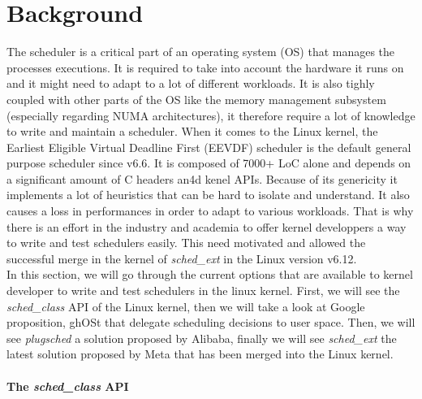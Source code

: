 \section{Background}

\par The scheduler is a critical part of an operating system (OS) that manages the processes executions. It is required to take into account the hardware it runs on and it might need to adapt to a lot of different workloads. It is also tighly coupled with other parts of the OS like the memory management subsystem (especially regarding NUMA architectures), it therefore require a lot of knowledge to write and maintain a scheduler. When it comes to the Linux kernel, the Earliest Eligible Virtual Deadline First (EEVDF) scheduler is the default general purpose scheduler since v6.6. It is composed of 7000+ LoC alone and depends on a significant amount of C headers an4d kenel APIs. Because of its genericity it implements a lot of heuristics 
that can be hard to isolate and understand. It also causes a loss in performances in order to adapt to various workloads. That is why there is an effort in the industry and academia to offer kernel developpers a way to write and test schedulers easily. This need motivated and allowed the successful merge in the kernel of \textit{sched\_ext} in the Linux version v6.12. \\
In this section, we will go through the current options that are available to kernel developer to write and test schedulers in the linux kernel. First, we will see the \textit{sched\_class} API of the Linux kernel, then we will take a look at Google proposition, ghOSt\cite{ghost-paper} that delegate scheduling decisions to user space. Then, we will see \textit{plugsched} a solution proposed by Alibaba, finally we will see \textit{sched\_ext} the latest solution proposed by Meta that has been merged into the Linux kernel.

\paragraph{The \textit{sched\_class} API}


